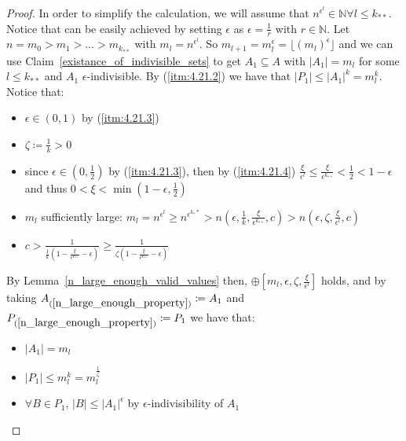         \begin{proof}
            In order to simplify the calculation, we will assume that $n^{\epsilon^l} \in \mathbb{N} \forall l \leq k_{**}$.
            Notice that can be easily achieved by setting $\epsilon$ as $\epsilon = \frac{1}{r}$ with $r \in \mathbb{N}$.
            Let $n = m_0 > m_1 > \dots > m_{k_{**}}$ with $m_l = n^{\epsilon^{l}}$.
            So $m_{l+1} = m_l^\epsilon = \lfloor (m_l)^\epsilon \rfloor$ and we can use Claim~\ref{existance_of_indivisible_sets}
                to get $A_1 \subseteq A$ with $|A_1| = m_l$ for some $l \leq k_{**}$ and $A_1$ $\epsilon$-indivisible.
            By (\ref{itm:4.21.2}) we have that $|P_1| \leq |A_1|^k = m_l^k$.
            Notice that:
            \begin{itemize}
                \item $\epsilon \in (0,1)$ by (\ref{itm:4.21.3})
                \item $\zeta \coloneqq \frac{1}{k} > 0$
                \item since $\epsilon \in \left( 0, \frac{1}{2} \right)$ by (\ref{itm:4.21.3}), then by (\ref{itm:4.21.4})
                    $\frac{\xi}{\epsilon^l} \leq \frac{\xi}{\epsilon^{k_{**}}} < \frac{1}{2} < 1 - \epsilon$ and
                    thus $0 < \xi < \min(1-\epsilon, \frac{1}{2})$
                \item $m_l$ sufficiently large: $m_l = n^{\epsilon^l} \geq n^{\epsilon^{k_**}} > n\left( \epsilon, \frac{1}{k},
                    \frac{\xi}{\epsilon^{k_{**}}}, c \right) > n\left( \epsilon, \zeta, \frac{\xi}{\epsilon^{l}}, c \right)$
                \item $c > \frac{1}{\frac{1}{k} (1 - \frac{\xi}{\epsilon^{k_{**}}} - \epsilon)}
                    \geq \frac{1}{\zeta (1 - \frac{\xi}{\epsilon^{k_{**}}} - \epsilon)}$
            \end{itemize}
            By Lemma~\ref{n_large_enough_valid_values} then, $\oplus\left[ m_l, \epsilon, \zeta, \frac{\xi}{\epsilon^l} \right]$
                holds, and by taking $A_{(\ref{n_large_enough_property})} \coloneqq A_1$ and
                $P_{(\ref{n_large_enough_property})} \coloneqq P_1$ we have that:
            \begin{itemize}
                \item $|A_1| = m_l$
                \item $|P_1| \leq m_l^k = m_l^{\frac{1}{\zeta}}$
                \item $\forall B \in P_1$, $|B| \leq |A_1|^\epsilon$ by $\epsilon$-indivisibility of $A_1$

\end{itemize}
\end{proof}
